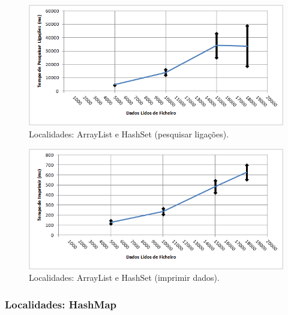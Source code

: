 \documentclass[a5paper,twocolumn, 11pt]{article}
\begin{document}
\begin{figure}[h!b!t!]
    \caption[Localidades: ArrayList e HashSet (pesquisar ligações)]{Localidades: ArrayList e HashSet (pesquisar ligações).}
    \label{hashtable}
    \centering
        \includegraphics[width=400pt]{cloc_conf2_o4.png}
\end{figure}
\begin{figure}[h!b!t!]
    \caption[Localidades: ArrayList e HashSet (imprimir dados)]{Localidades: ArrayList e HashSet (imprimir dados).}
    \label{hashtable}
    \centering
        \includegraphics[width=400pt]{cloc_conf2_o5.png}
\end{figure}

\newpage
\twocolumn
\subsubsection{Localidades: HashMap}
\end{document}

